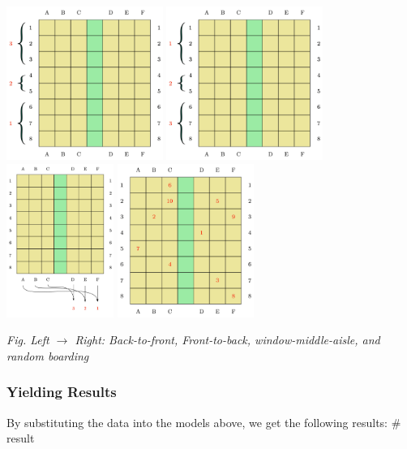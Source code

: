 \documentclass{article}
\begin{document}
	\begin{center}
		\includegraphics[height=5cm]{planerow1.jpg}
		\includegraphics[height=5cm]{planerow2.jpg}\\
		\includegraphics[height=5cm]{wdmd.jpg}
		\includegraphics[height=5cm]{planerandom.jpg}

		\small \textit{Fig. Left \(\to\) Right: Back-to-front, Front-to-back, window-middle-aisle, and random boarding}
	\end{center}

	\subsubsection{Yielding Results}
	By substituting the data into the models above, we get the following results:
	\# result
\end{document}
